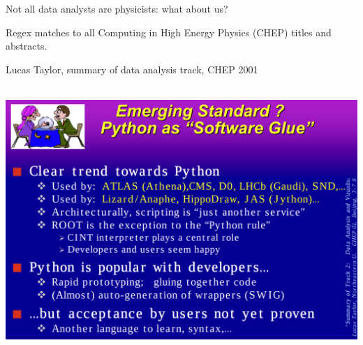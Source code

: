 \documentclass[aspectratio=169]{beamer}
\begin{document}
\begin{frame}{Not all data analysts are physicists: what about us?}
\vspace{0.25 cm}

Regex matches to all Computing in High Energy Physics (CHEP) titles and abstracts.

\vspace{-0.1 cm}
\begin{center}
\end{center}
\end{frame}

\begin{frame}{Lucas Taylor, summary of data analysis track, CHEP 2001}
\vspace{0.25 cm}

\mbox{ } \hfill \includegraphics[width=0.82\linewidth]{PLOTS/chep-2001-python.png} \hfill \mbox{ }
\end{frame}
\end{document}
